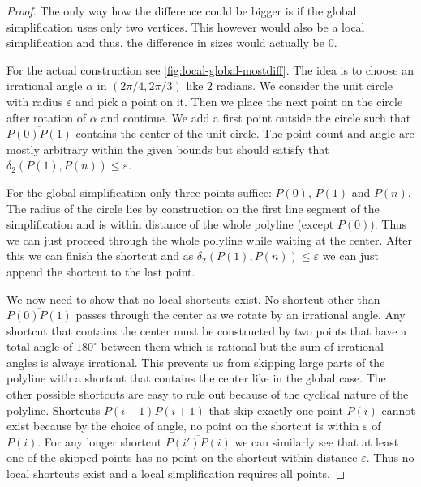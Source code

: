 \begin{proof}
  The only way how the difference could be bigger is if the global simplification uses only two vertices. This however would also be a local simplification and thus, the difference in sizes would actually be \(0\).

	For the actual construction see \cref{fig:local-global-mostdiff}. The idea is to choose an irrational angle \(\alpha\) in \((2\pi/4, 2\pi/3)\) like \(2\) radians. We consider the unit circle with radius \(\varepsilon\) and pick a point on it. Then we place the next point on the circle after rotation of \(\alpha\) and continue. We add a first point outside the circle such that \(\overline{P(0)P(1)}\) contains the center of the unit circle. The point count and angle are mostly arbitrary within the given bounds but should satisfy that \(\delta_2(P(1), P(n)) \leq \varepsilon\).

	For the global simplification only three points suffice: \(P(0)\), \(P(1)\) and \(P(n)\). The radius of the circle lies by construction on the first line segment of the simplification and is within distance of the whole polyline (except \(P(0)\)). Thus we can just proceed through the whole polyline while waiting at the center. After this we can finish the shortcut and as \(\delta_2(P(1),P(n)) \leq \varepsilon\) we can just append the shortcut to the last point.

	We now need to show that no local shortcuts exist. No shortcut other than \(\overline{P(0)P(1)}\) passes through the center as we rotate by an irrational angle. Any shortcut that contains the center must be constructed by two points that have a total angle of \(180^\circ\) between them which is rational but the sum of irrational angles is always irrational. This prevents us from skipping large parts of the polyline with a shortcut that contains the center like in the global case. The other possible shortcuts are easy to rule out because of the cyclical nature of the polyline. Shortcuts \(\overline{P(i-1)P(i+1)}\) that skip exactly one point \(P(i)\) cannot exist because by the choice of angle, no point on the shortcut is within \(\varepsilon\) of \(P(i)\). For any longer shortcut \(\overline{P(i')P(i)}\) we can similarly see that at least one of the skipped points has no point on the shortcut within distance \(\varepsilon\). Thus no local shortcuts exist and a local simplification requires all points.
\end{proof}

